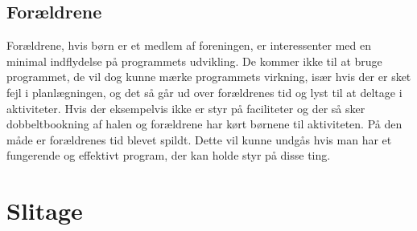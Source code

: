 
\subsection{Forældrene}
Forældrene, hvis børn er et medlem af foreningen, er interessenter med en minimal indflydelse på programmets udvikling. De kommer ikke til at bruge programmet, de vil dog kunne mærke programmets virkning, især hvis der er sket fejl i planlægningen, og det så går ud over forældrenes tid og lyst til at deltage i aktiviteter. Hvis der eksempelvis ikke er styr på faciliteter og der så sker dobbeltbookning af halen og forældrene har kørt børnene til aktiviteten. På den måde er forældrenes tid blevet spildt. Dette vil kunne undgås hvis man har et fungerende og effektivt program, der kan holde styr på disse ting.
\\

\section{Slitage}

